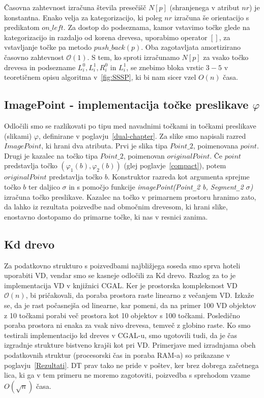 \documentclass[a4paper, 12pt]{book}
\newcommand{\OO}{\ensuremath{\mathcal{O}}} %
\newcommand{\U}{\texttt{\_}}
\begin{document}
Časovna zahtevnost izračuna števila presečišč $N[p]$ (shranjenega v atribut $nr$) je konstantna. Enako velja za kategorizacijo, ki poleg $nr$ izračuna še orientacijo s predikatom $on\U left$. Za dostop do podseznama, kamor vstavimo točke glede na kategorizacijo in razdaljo od korena drevesa, uporabimo operator $[]$, za vstavljanje točke pa metodo $push\U back(p)$. Oba zagotavljata amortizirano časovno zahtevnost $\OO(1)$. S tem, ko sproti izračunamo $N[p]$ za vsako točko drevesa in podsezname $L_i^0, L_i^1, R_i^0$ in $L_i^1$, se znebimo bloka vrstic $3-5$ v teoretičnem opisu algoritma v~\ref{fig:SSSP}, ki bi nam sicer vzel $O(n)$ časa.

\subsection{ImagePoint - implementacija točke preslikave $\varphi$}

Odločili smo se razlikovati po tipu med navadnimi točkami in točkami preslikave (slikami) $\varphi$, definirane v poglavju~\ref{dual-chapter}. Za slike smo napisali razred $ImagePoint$, ki hrani dva atributa. Prvi je slika tipa $Point\texttt{\_}2$, poimenovana $point$. Drugi je kazalec na točko tipa $Point\texttt{\_}2$, poimenovan $originalPoint$. Če $point$ predstavlja točko $(\varphi_1(b), \varphi_2(b))$ (glej poglavje~\ref{compact}), potem $originalPoint$ predstavlja točko $b$. Konstruktor razreda kot argumenta sprejme točko $b$ ter daljico $\sigma$ in s pomočjo funkcije \textit{imagePoint(Point\U 2 b, Segment\U 2 $\sigma$)} izračuna točko preslikave. Kazalec na točko v primarnem prostoru hranimo zato, da lahko iz rezultata poizvedbe nad območnim drevesom, ki hrani slike, enostavno dostopamo do primarne točke, ki nas v resnici zanima.

\subsection{Kd drevo}
Za podatkovno strukturo s poizvedbami najbližjega soseda smo sprva hoteli uporabiti VD, vendar smo se kasneje odločili za Kd drevo. Razlog za to je implementacija VD v knjižnici CGAL. Ker je prostorska kompleksnost VD $\OO(n)$, bi pričakovali, da poraba prostora raste linearno z večanjem VD. Izkaže se, da je rast počasnejša od linearne, kar pomeni, da na primer 100 VD objektov z 10 točkami porabi več prostora kot 10 objektov s 100 točkami. Posledično poraba prostora ni enaka za vsak nivo drevesa, temveč z globino raste. Ko smo testirali implementacijo kd dreves v CGAL-u, smo ugotovili tudi, da je čas izgradnje strukture bistveno krajši kot pri VD. Primerjave med izradnjama obeh podatkovnih struktur (procesorski čas in poraba RAM-a) so prikazane v poglavju~\ref{Rezultati}. DT prav tako ne pride v poštev, ker brez dobrega začetnega lica, ki ga v tem primeru ne moremo zagotoviti, poizvedba s sprehodom vzame $O(\sqrt{n})$ časa.
\end{document}
